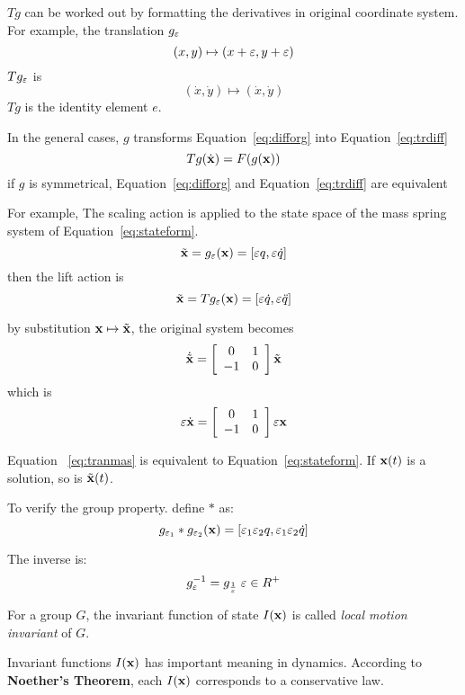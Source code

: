$Tg$ can be worked out by formatting the derivatives in original coordinate system.
For example, the translation $g_{\varepsilon}$ 
\[
(x,y)\mapsto (x+\varepsilon,y+\varepsilon)
\]
$Tg_{\varepsilon}$ is
\[
(\dot{x},\dot{y}) \mapsto (\dot{x},\dot{y})
\]
$Tg$ is the identity element $e$.


In the general cases, $g$ transforms Equation~\ref{eq:difforg} into Equation~\ref{eq:trdiff}
\begin{equation}
\label{eq:trdiff}
Tg(\dot{\mathbf{x}})=F(g(\mathbf{x}))
\end{equation}
if $g$ is symmetrical, Equation~\ref{eq:difforg} and Equation~\ref{eq:trdiff} are equivalent







 	
For example, 
The scaling action is applied to the state space of the mass spring system of Equation~\ref{eq:stateform}. 
\[
\tilde{\mathbf{x}}=g_{\varepsilon}(\mathbf{x})=[\varepsilon q, \varepsilon \dot{q} ]
\]
then the lift action is
\[
\tilde{\mathbf{x}}=Tg_{\varepsilon}(\mathbf{x})=[\varepsilon \dot{q}, \varepsilon \ddot{q}]
\]



by substitution $\mathbf{x} \mapsto \tilde{\mathbf{x}}$, the original system becomes
\[ 
\dot{\tilde{\mathbf{x}}}=
\left[ 
\begin{array}{cc}
0 &1\\
-1 &0 
\end{array}
\right]\tilde{\mathbf{x}}
\]
which is 
\begin{equation}
\label{eq:tranmas} 
\varepsilon \dot{\mathbf{x}}=
\left[ 
\begin{array}{cc}
0 &1\\
-1 &0 
\end{array}
\right]\varepsilon \mathbf{x}
\end{equation}

Equation ~\ref{eq:tranmas} is equivalent to  Equation~\ref{eq:stateform}.
If $\mathbf{x}(t)$ is a solution, so is $\tilde{\mathbf{x}}(t)$.

To verify the group property. define $*$ as:
\[
g_{\varepsilon_1}*g_{\varepsilon_2}(\mathbf{x})=[\varepsilon_1 \varepsilon_2 q, \varepsilon_1 \varepsilon_2 \dot{q}]
\]

The inverse is:
\[
g_{\varepsilon}^{-1}=g_{\frac{1}{\varepsilon}} \;\varepsilon \in R^+
\]

\begin{mydef}
For a group $G$, the invariant function of state $I(\mathbf{x})$ is called \emph{local motion invariant} of $G$. 
\end{mydef}

Invariant functions $I(\mathbf{x})$ has important  meaning in dynamics. 
According  to \textbf{Noether's Theorem}, each $I(\mathbf{x})$ corresponds to a conservative law. 


